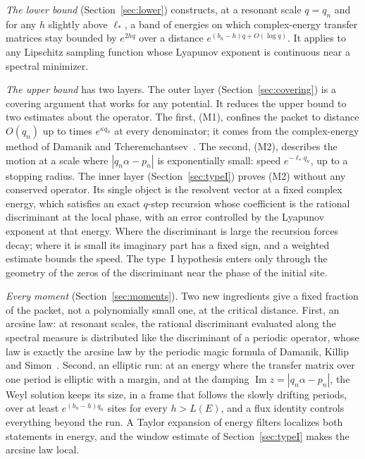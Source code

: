\emph{The lower bound} (Section~\ref{sec:lower}) constructs, at a resonant scale $q=q_n$ and for any $h$ slightly above $\ell_*$, a band of energies on which complex-energy transfer matrices stay bounded by $e^{2hq}$ over a distance $e^{(b_n-h)q+O(\log q)}$. It applies to any Lipschitz sampling function whose Lyapunov exponent is continuous near a spectral minimizer.

\emph{The upper bound} has two layers. The outer layer (Section~\ref{sec:covering}) is a covering argument that works for any potential. It reduces the upper bound to two estimates about the operator. The first, (M1), confines the packet to distance $O(q_n)$ up to times $e^{\kappa q_n}$ at every denominator; it comes from the complex-energy method of Damanik and Tcheremchantsev~\cite{DT2007}. The second, (M2), describes the motion at a scale where $|q_n\alpha-p_n|$ is exponentially small: speed $e^{-\ell_*q_n}$, up to a stopping radius. The inner layer (Section~\ref{sec:typeI}) proves (M2) without any conserved operator. Its single object is the resolvent vector at a fixed complex energy, which satisfies an exact $q$-step recursion whose coefficient is the rational discriminant at the local phase, with an error controlled by the Lyapunov exponent at that energy. Where the discriminant is large the recursion forces decay; where it is small its imaginary part has a fixed sign, and a weighted estimate bounds the speed. The type~I hypothesis enters only through the geometry of the zeros of the discriminant near the phase of the initial site.

\emph{Every moment} (Section~\ref{sec:moments}). Two new ingredients give a fixed fraction of the packet, not a polynomially small one, at the critical distance. First, an arcsine law: at resonant scales, the rational discriminant evaluated along the spectral measure is distributed like the discriminant of a periodic operator, whose law is exactly the arcsine law by the periodic magic formula of Damanik, Killip and Simon~\cite{DKS2010}. Second, an elliptic run: at an energy where the transfer matrix over one period is elliptic with a margin, and at the damping $\operatorname{Im}z=|q_n\alpha-p_n|$, the Weyl solution keeps its size, in a frame that follows the slowly drifting periods, over at least $e^{(b_n-h)q_n}$ sites for every $h>L(E)$, and a flux identity controls everything beyond the run. A Taylor expansion of energy filters localizes both statements in energy, and the window estimate of Section~\ref{sec:typeI} makes the arcsine law local.

